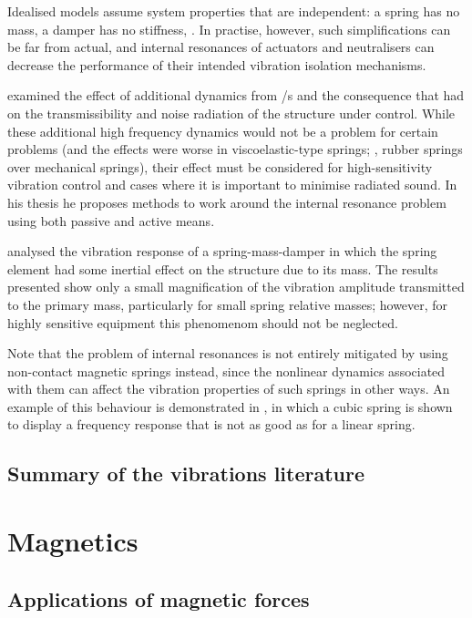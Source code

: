 Idealised models assume system properties that are independent: a spring has no mass, a damper has no stiffness, \etc.
In practise, however, such simplifications can be far from actual, and internal resonances of actuators and neutralisers can decrease the performance of their intended vibration isolation mechanisms.

\textcite{du2003thesis} examined the effect of additional dynamics from \vibneut/s and the consequence that had on the transmissibility and noise radiation of the structure under control.
While these additional high frequency dynamics would not be a problem for certain problems (and the effects were worse in viscoelastic-type springs; \ie, rubber springs over mechanical springs), their effect must be considered for high-sensitivity vibration control and cases where it is important to minimise radiated sound.
In his thesis he proposes methods to work around the internal resonance problem using both passive and active means.

\textcite{wu2006} analysed the vibration response of a spring-mass-damper in which the spring element had some inertial effect on the structure due to its mass.
The results presented show only a small magnification of the vibration amplitude transmitted to the primary mass, particularly for small spring relative masses; however, for highly sensitive equipment this phenomenom should not be neglected.

Note that the problem of internal resonances is not entirely mitigated by using non-contact magnetic springs instead, since the nonlinear dynamics associated with them  can affect the vibration properties of such springs in other ways.
An example of this behaviour is demonstrated in , in which a cubic spring is shown to display a frequency response that is not as good as for a linear spring.




\subsection{Summary of the vibrations literature}



\section{Magnetics}

\subsection{Applications of magnetic forces}

